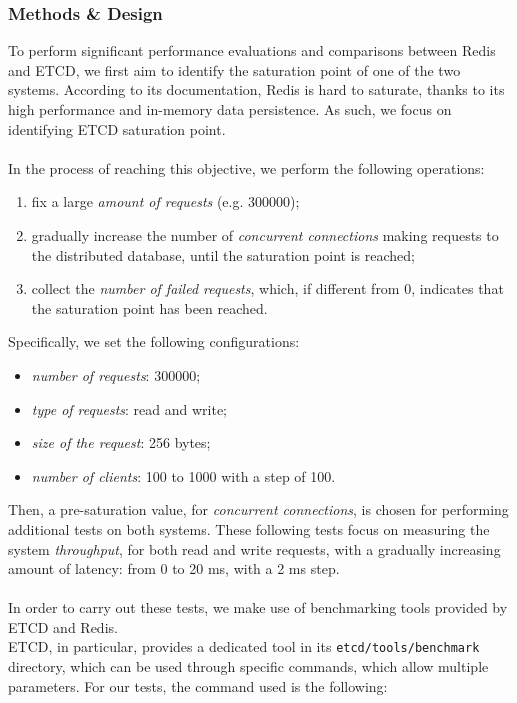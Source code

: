 \subsubsection{Methods \& Design}
To perform significant performance evaluations and comparisons between Redis and ETCD, we first aim to identify the saturation point of one of the two systems. According to its documentation, Redis is hard to saturate, thanks to its high performance and in-memory data persistence. As such, we focus on identifying ETCD saturation point. \\ \\
In the process of reaching this objective, we perform the following operations:
\begin{enumerate}
	\item fix a large \textit{amount of requests} (e.g. 300000);
	\item gradually increase the number of \textit{concurrent connections} making requests to the distributed database, until the saturation point is reached;
	\item collect the \textit{number of failed requests}, which, if different from 0, indicates that the saturation point has been reached.
\end{enumerate}
Specifically, we set the following configurations:
\begin{itemize}
	\item \textit{number of requests}: 300000;
	\item \textit{type of requests}: read and write;
	\item \textit{size of the request}: 256 bytes;
	\item \textit{number of clients}: 100 to 1000 with a step of 100.
\end{itemize}
Then, a pre-saturation value, for \textit{concurrent connections}, is chosen for performing additional tests on both systems. These following tests focus on measuring the system \textit{throughput}, for both read and write requests, with a gradually increasing amount of latency: from 0 to 20 ms, with a 2 ms step. \\ \\
In order to carry out these tests, we make use of benchmarking tools provided by ETCD and Redis. \\
ETCD, in particular, provides a dedicated tool in its \texttt{etcd/tools/benchmark} directory, which can be used through specific commands, which allow multiple parameters. For our tests, the command used is the following: \\ \\
